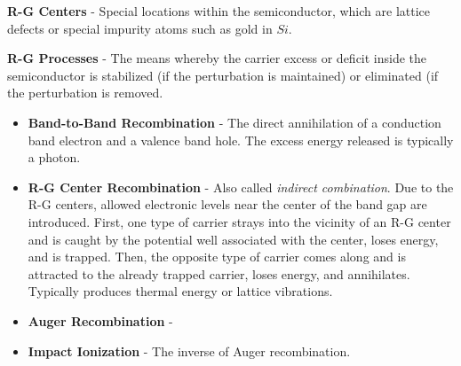 \vspace{0.5cm}
\noindent
    \textbf{R-G Centers} - Special locations within the semiconductor, which are lattice defects or special impurity atoms such as gold in $Si$.

\vspace{0.5cm}
\noindent
    \textbf{R-G Processes} - The means whereby the carrier excess or deficit inside the semiconductor is stabilized (if the perturbation is maintained) or eliminated (if the perturbation is removed.
    \vspace{0.15cm}
    \begin{itemize}
        \setlength\itemsep{0.5em}
        \item{\textbf{Band-to-Band Recombination} - The direct annihilation of a conduction band electron and a valence band hole.  The excess energy released is typically a photon.}
        \item{\textbf{R-G Center Recombination} - Also called \emph{indirect combination}.  Due to the R-G centers, allowed electronic levels near the center of the band gap are introduced.  First, one type of carrier strays into the vicinity of an R-G center and is caught by the potential well associated with the center, loses energy, and is trapped.  Then, the opposite type of carrier comes along and is attracted to the already trapped carrier, loses energy, and annihilates.  Typically produces thermal energy or lattice vibrations.}
        \item{\textbf{Auger Recombination} - }
        \item{\textbf{Impact Ionization} - The inverse of Auger recombination.}
    \end{itemize}
